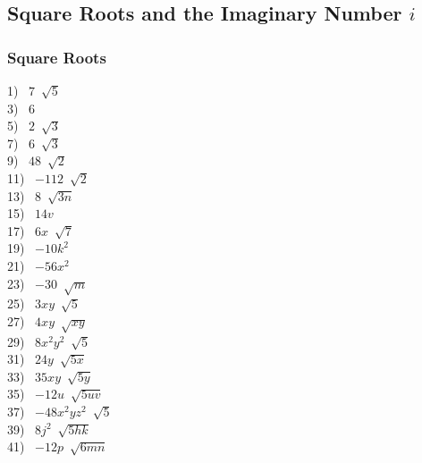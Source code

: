 \documentclass[11pt]{book}
\newcommand{\tmstrong}[1]{\textbf{#1}}
\theoremstyle{definition}  %
\newcommand{\pp}{\par~\par}
\begin{document}

\subsection*{Square Roots and the Imaginary Number $i$}

\subsubsection{Square Roots}


\begin{multicols}{2}
	1)~ $7~\sqrt[]{5}$\\
  3)~ $6$\\
  5)~ $2~\sqrt[]{3}$\\
  7)~ $6~\sqrt[]{3}$\\
  9)~ $48~\sqrt[]{2}$\\
  11)~ $-112~\sqrt[]{2}$\\
  13)~ $8~\sqrt[]{3 n}$\\
  15)~ $14v$\\
  17)~ $6x~\sqrt[]{7}$\\
  19)~ $-10k^2$\\
  21)~ $- 56x^2$\\
  23)~ $- 30~\sqrt[]{m}$\\
  25)~ $3xy~\sqrt[]{5}$\\
  27)~ $4xy~\sqrt[]{xy}$\\
  29)~ $8x^2y^2~\sqrt[]{5}$\\
  31)~ $24y~\sqrt[]{5x}$\\
  33)~ $35xy~\sqrt[]{5y}$\\
  35)~ $- 12u~\sqrt[]{5 u v}$\\
  37)~ $- 48x^2yz^2~\sqrt[]{5}$\\
  39)~ $8 j^2~\sqrt[]{5hk}$\\
  41)~ $- 12p~\sqrt[]{6m n}$%

\end{multicols}
\end{document}
